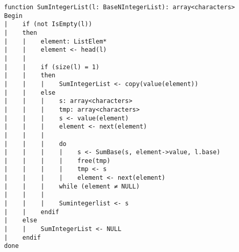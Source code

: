 \begin{lstlisting}[breaklines]
function SumIntegerList(l: BaseNIntegerList): array<characters>
Begin
|    if (not IsEmpty(l))
|    then
|    |    element: ListElem*
|    |    element <- head(l)
|    |
|    |    if (size(l) = 1)
|    |    then
|    |    |    SumIntegerList <- copy(value(element))
|    |    else
|    |    |    s: array<characters>
|    |    |    tmp: array<characters>
|    |    |    s <- value(element)
|    |    |    element <- next(element)
|    |    |
|    |    |    do
|    |    |    |    s <- SumBase(s, element->value, l.base)
|    |    |    |    free(tmp)
|    |    |    |    tmp <- s
|    |    |    |    element <- next(element)
|    |    |    while (element ≠ NULL)
|    |    |
|    |    |    Sumintegerlist <- s
|    |    endif
|    else
|    |    SumIntegerList <- NULL
|    endif
done
\end{lstlisting}

